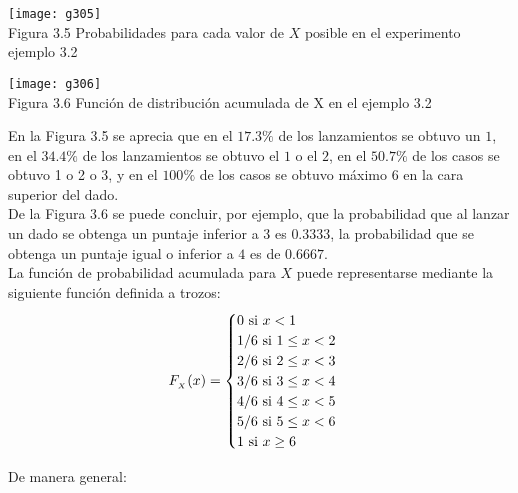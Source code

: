 \documentclass[base=hide,12pt]{elegantbook}
\begin{document}

\begin{center}
\texttt{[image: g305]}\\
Figura 3.5 Probabilidades para cada valor de $X$  posible en el experimento ejemplo 3.2 
\end{center}
%

\begin{center}
\texttt{[image: g306]}\\
Figura 3.6 Función de distribución acumulada de X en el ejemplo 3.2
\end{center}

En la Figura 3.5 se aprecia que en el $17.3\%$ de los lanzamientos se obtuvo un $1$, en el $34.4\%$ de los lanzamientos se obtuvo el $1$ o el $2$, en el $50.7\%$ de los casos se obtuvo 1 o 2 o 3, y en el $100\%$ de los casos se obtuvo máximo $6$ en la cara superior del dado.\\
	
De la Figura 3.6  se puede concluir, por ejemplo, que la probabilidad que al lanzar un dado se obtenga un puntaje inferior a $3$ es $0.3333$, la probabilidad que se obtenga un puntaje igual o inferior a $4$ es de $0.6667$.\\
%
La función de probabilidad acumulada para $X$ puede representarse mediante la siguiente función definida a trozos:
%	
$$F_{_X}(x)= \begin{cases}
	0  \textnormal{ si } x<1 \\
	1/6 \textnormal{ si }  1\leq x<2  \\
	2/6 \textnormal{ si }  2\leq x<3 \\
	3/6\textnormal{ si }  3\leq x<4 \\
	4/6\textnormal{ si }  4\leq x<5 \\
	5/6\textnormal{ si }  5\leq x<6 \\
	1\textnormal{ si } x\geq6  \\
\end{cases}
$$

De manera general:
\end{document}

